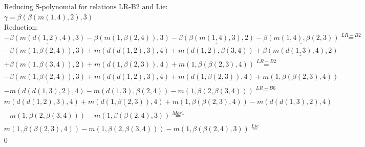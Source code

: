 \documentclass[11pt]{amsart}
\begin{document}
\begin{align*} 
& \text{Reducing S-polynomial for relations LR-B2 and Lie:} \\ 
& \gamma = \beta(\beta(m(1,4),2),3) \\ 
& \text{Reduction}: \\& - \underline{\beta(m(d(1,2),4),3)} - \beta(m(1,\beta(2,4)),3) - \underline{\beta(\beta(m(1,4),3),2)} - \underline{\beta(m(1,4),\beta(2,3))} \stackrel{ LR-B2 }{=}  \\ 
& - \beta(m(1,\beta(2,4)),3) + m(d(d(1,2),3),4) + m(d(1,2),\beta(3,4)) + \underline{\beta(m(d(1,3),4),2)}\\ 
 &  + \underline{\beta(m(1,\beta(3,4)),2)} + m(d(1,\beta(2,3)),4) + m(1,\beta(\beta(2,3),4)) \stackrel{ LR-B2 }{=}  \\ 
& - \underline{\beta(m(1,\beta(2,4)),3)} + m(d(d(1,2),3),4) + m(d(1,\beta(2,3)),4) + m(1,\beta(\beta(2,3),4))\\ 
 &  - m(d(d(1,3),2),4) - m(d(1,3),\beta(2,4)) - m(1,\beta(2,\beta(3,4))) \stackrel{ LR-B6 }{=}  \\ 
&m(d(d(1,2),3),4) + \underline{m(d(1,\beta(2,3)),4)} + m(1,\beta(\beta(2,3),4)) - m(d(d(1,3),2),4)\\ 
 &  - m(1,\beta(2,\beta(3,4))) - m(1,\beta(\beta(2,4),3)) \stackrel{ Mor1 }{=}  \\ 
&\underline{m(1,\beta(\beta(2,3),4))} - m(1,\beta(2,\beta(3,4))) - m(1,\beta(\beta(2,4),3)) \stackrel{ Lie }{=}  \\ 
&0\\ 
\end{align*} 
 
\end{document}
